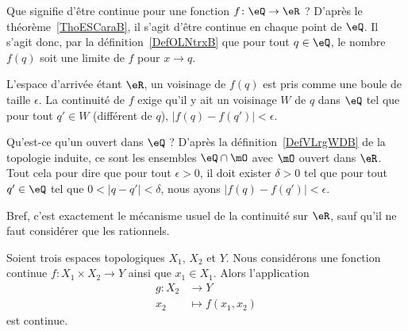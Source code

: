 \begin{example}     \label{EXooHWIIooYYbfGE}
	Que signifie d'être continue pour une fonction \( f\colon \eQ\to \eR\) ? D'après le théorème~\ref{ThoESCaraB}, il s'agit d'être continue en chaque point de \( \eQ\). Il s'agit donc, par la définition~\ref{DefOLNtrxB} que pour tout \( q\in \eQ\), le nombre \( f(q)\) soit une limite de \( f\) pour \( x\to q\).

	L'espace d'arrivée étant \( \eR\), un voisinage de \( f(q)\) est pris comme une boule de taille \( \epsilon\). La continuité de \( f\) exige qu'il y ait un voisinage \( W\) de \( q\) dans \( \eQ\) tel que pour tout \( q'\in W\) (différent de \( q\)), \( | f(q)-f(q') |<\epsilon\).

	Qu'est-ce qu'un ouvert dans \( \eQ\) ? D'après la définition~\ref{DefVLrgWDB} de la topologie induite, ce sont les ensembles \( \eQ\cap\mO\) avec \( \mO\) ouvert dans \( \eR\). Tout cela pour dire que pour tout \( \epsilon>0\), il doit exister \( \delta>0\) tel que pour tout \( q'\in \eQ\) tel que \( 0<| q-q' |<\delta\), nous ayons \( | f(q)-f(q') |<\epsilon\).

	Bref, c'est exactement le mécanisme usuel de la continuité sur \( \eR\), sauf qu'il ne faut considérer que les rationnels.
\end{example}

\begin{lemma}       \label{LEMooHAODooYSPmvH}
	Soient trois espaces topologiques \( X_1\), \( X_2\) et \( Y\). Nous considérons une fonction continue \( f\colon X_1\times X_2\to Y\) ainsi que \( x_1\in X_1\). Alors l'application
	\begin{equation}
		\begin{aligned}
			g\colon X_2 & \to Y              \\
			x_2         & \mapsto f(x_1,x_2)
		\end{aligned}
	\end{equation}
	est continue.
\end{lemma}

